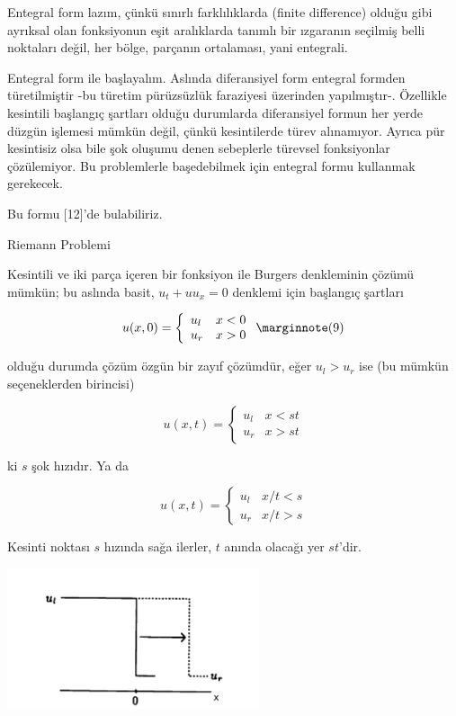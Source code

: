 \documentclass[12pt,fleqn]{article}\usepackage{../../common}
\begin{document}
Entegral form lazım, çünkü sınırlı farklılıklarda (finite difference) olduğu
gibi ayrıksal olan fonksiyonun eşit aralıklarda tanımlı bir ızgaranın seçilmiş
belli noktaları değil, her bölge, parçanın ortalaması, yani entegrali.

Entegral form ile başlayalım. Aslında diferansiyel form entegral formden
türetilmiştir -bu türetim pürüzsüzlük faraziyesi üzerinden
yapılmıştır-. Özellikle kesintili başlangıç şartları olduğu durumlarda
diferansiyel formun her yerde düzgün işlemesi mümkün değil, çünkü kesintilerde
türev alınamıyor. Ayrıca pür kesintisiz olsa bile şok oluşumu denen sebeplerle
türevsel fonksiyonlar çözülemiyor. Bu problemlerle başedebilmek için entegral
formu kullanmak gerekecek.

Bu formu [12]'de bulabiliriz. 

Riemann Problemi

Kesintili ve iki parça içeren bir fonksiyon ile Burgers denkleminin çözümü
mümkün; bu aslında basit, $u_t + u u_x = 0$ denklemi için başlangıç şartları

$$
u(x,0) = 
\left\{ \begin{array}{ll}
u_l & x < 0 \\
u_r & x > 0 
\end{array} \right.
\mlabel{9}
$$

olduğu durumda çözüm özgün bir zayıf çözümdür, eğer $u_l > u_r$ ise (bu mümkün
seçeneklerden birincisi)

$$
u(x,t) = 
\left\{ \begin{array}{ll}
u_l & x < st \\
u_r & x > st 
\end{array} \right.
$$

ki $s$ şok hızıdır. Ya da

$$
u(x,t) = 
\left\{ \begin{array}{ll}
u_l & x/t < s \\
u_r & x/t > s 
\end{array} \right.
$$

Kesinti noktası $s$ hızında sağa ilerler, $t$ anında olacağı yer $st$'dir.

\includegraphics[width=20em]{compscieng_bpp50fv1_01.png}
\end{document}

